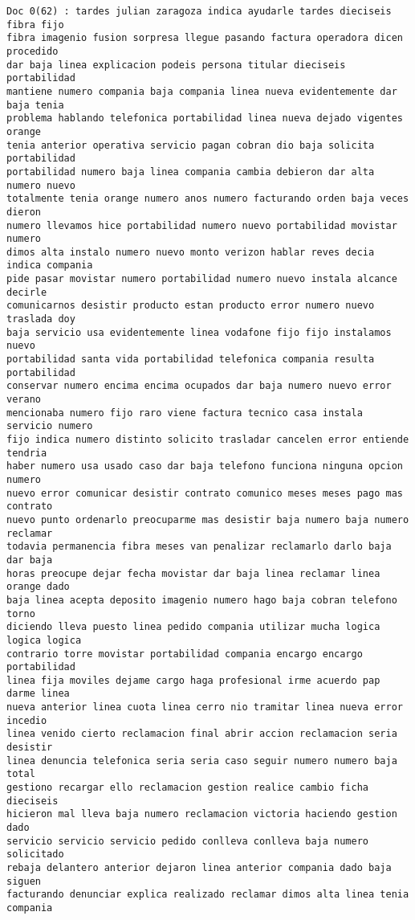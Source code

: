 \begin{Verbatim}[commandchars=\\\{\}]
Doc 0(62) : tardes julian zaragoza indica ayudarle tardes dieciseis fibra fijo
fibra imagenio fusion sorpresa llegue pasando factura operadora dicen procedido
dar baja linea explicacion podeis persona titular dieciseis portabilidad
mantiene numero compania baja compania linea nueva evidentemente dar baja tenia
problema hablando telefonica portabilidad linea nueva dejado vigentes orange
tenia anterior operativa servicio pagan cobran dio baja solicita portabilidad
portabilidad numero baja linea compania cambia debieron dar alta numero nuevo
totalmente tenia orange numero anos numero facturando orden baja veces dieron
numero llevamos hice portabilidad numero nuevo portabilidad movistar numero
dimos alta instalo numero nuevo monto verizon hablar reves decia indica compania
pide pasar movistar numero portabilidad numero nuevo instala alcance decirle
comunicarnos desistir producto estan producto error numero nuevo traslada doy
baja servicio usa evidentemente linea vodafone fijo fijo instalamos nuevo
portabilidad santa vida portabilidad telefonica compania resulta portabilidad
conservar numero encima encima ocupados dar baja numero nuevo error verano
mencionaba numero fijo raro viene factura tecnico casa instala servicio numero
fijo indica numero distinto solicito trasladar cancelen error entiende tendria
haber numero usa usado caso dar baja telefono funciona ninguna opcion numero
nuevo error comunicar desistir contrato comunico meses meses pago mas contrato
nuevo punto ordenarlo preocuparme mas desistir baja numero baja numero reclamar
todavia permanencia fibra meses van penalizar reclamarlo darlo baja dar baja
horas preocupe dejar fecha movistar dar baja linea reclamar linea orange dado
baja linea acepta deposito imagenio numero hago baja cobran telefono torno
diciendo lleva puesto linea pedido compania utilizar mucha logica logica logica
contrario torre movistar portabilidad compania encargo encargo portabilidad
linea fija moviles dejame cargo haga profesional irme acuerdo pap darme linea
nueva anterior linea cuota linea cerro nio tramitar linea nueva error incedio
linea venido cierto reclamacion final abrir accion reclamacion seria desistir
linea denuncia telefonica seria seria caso seguir numero numero baja total
gestiono recargar ello reclamacion gestion realice cambio ficha dieciseis
hicieron mal lleva baja numero reclamacion victoria haciendo gestion dado
servicio servicio servicio pedido conlleva conlleva baja numero solicitado
rebaja delantero anterior dejaron linea anterior compania dado baja siguen
facturando denunciar explica realizado reclamar dimos alta linea tenia compania

\end{Verbatim}
